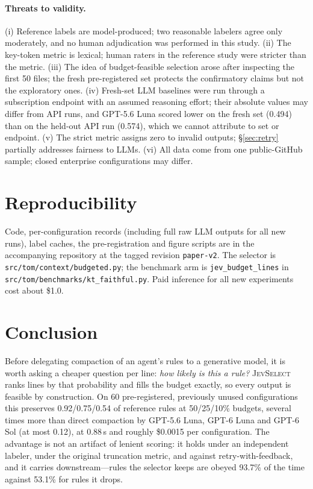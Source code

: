 \documentclass[11pt,a4paper]{article}
\newcommand{\sel}{\textsc{JevSelect}}
\begin{document}
\paragraph{Threats to validity.} (i) Reference labels are model-produced; two reasonable labelers agree only moderately, and no human adjudication was performed in this study. (ii) The key-token metric is lexical; human raters in the reference study were stricter than the metric. (iii) The idea of budget-feasible selection arose after inspecting the first 50 files; the fresh pre-registered set protects the confirmatory claims but not the exploratory ones. (iv) Fresh-set LLM baselines were run through a subscription endpoint with an assumed reasoning effort; their absolute values may differ from API runs, and GPT-5.6 Luna scored lower on the fresh set (0.494) than on the held-out API run (0.574), which we cannot attribute to set or endpoint. (v) The strict metric assigns zero to invalid outputs; \S\ref{sec:retry} partially addresses fairness to LLMs. (vi) All data come from one public-GitHub sample; closed enterprise configurations may differ.

\section{Reproducibility}
Code, per-configuration records (including full raw LLM outputs for all new runs), label caches, the pre-registration and figure scripts are in the accompanying repository at the tagged revision \texttt{paper-v2}. The selector is \texttt{src/tom/context/\allowbreak budgeted.py}; the benchmark arm is \texttt{jev\_budget\_lines} in \texttt{src/tom/benchmarks/\allowbreak kt\_faithful.py}. Paid inference for all new experiments cost about \$1.0.

\section{Conclusion}
Before delegating compaction of an agent's rules to a generative model, it is worth asking a cheaper question per line: \emph{how likely is this a rule?} \sel{} ranks lines by that probability and fills the budget exactly, so every output is feasible by construction. On 60 pre-registered, previously unused configurations this preserves 0.92/0.75/0.54 of reference rules at 50/25/10\% budgets, several times more than direct compaction by GPT-5.6 Luna, GPT-6 Luna and GPT-6 Sol (at most 0.12), at 0.88\,s and roughly \$0.0015 per configuration. The advantage is not an artifact of lenient scoring: it holds under an independent labeler, under the original truncation metric, and against retry-with-feedback, and it carries downstream---rules the selector keeps are obeyed 93.7\% of the time against 53.1\% for rules it drops.
\end{document}
